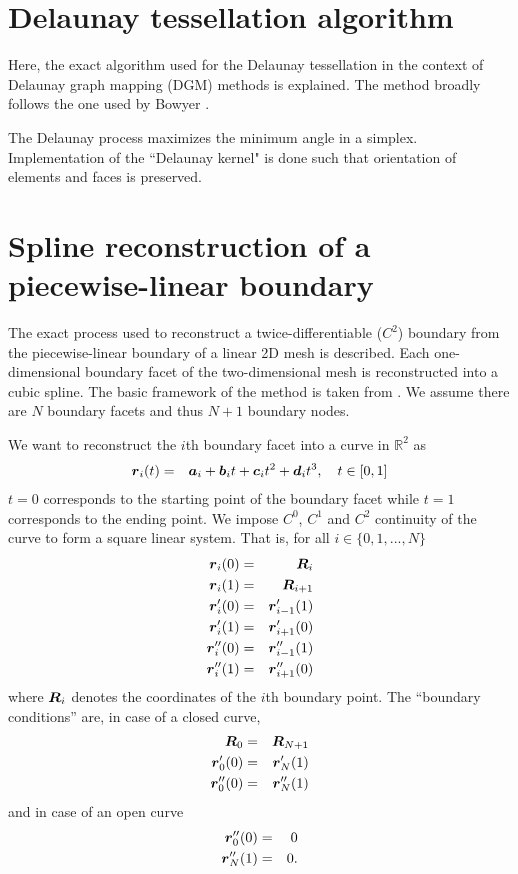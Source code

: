 \chapter{Delaunay tessellation algorithm}

Here, the exact algorithm used for the Delaunay tessellation in the context of Delaunay graph mapping (DGM) methods is explained. The method broadly follows the one used by Bowyer \cite{bowyer}. 

The Delaunay process maximizes the minimum angle in a simplex. Implementation of the ``Delaunay kernel" is done such that orientation of elements and faces is preserved.

\chapter[Spline reconstruction]{Spline reconstruction of a piecewise-linear boundary}
\label{app:spline}

The exact process used to reconstruct a twice-differentiable ($C^2$) boundary from the piecewise-linear boundary of a linear 2D mesh is described. Each one-dimensional boundary facet of the two-dimensional mesh is reconstructed into a cubic spline. The basic framework of the method is taken from \cite{sr:wolframspline}. We assume there are $N$ boundary facets and thus $N+1$ boundary nodes.

We want to reconstruct the $i$th boundary facet into a curve in $\mathbb{R}^2$ as
\begin{eqnarray}
\boldsymbol{r}_i(t) &=& \boldsymbol{a}_i + \boldsymbol{b}_i t + \boldsymbol{c}_it^2 + \boldsymbol{d}_it^3, \quad t \in [0,1]
\end{eqnarray}
$t=0$ corresponds to the starting point of the boundary facet while $t=1$ corresponds to the ending point. We impose $C^0$, $C^1$ and $C^2$ continuity of the curve to form a square linear system. That is, for all $i \in \{0,1,...,N\}$
\begin{eqnarray}
\boldsymbol{r}_i(0) &=& \boldsymbol{R}_i \\
\boldsymbol{r}_i(1) &=& \boldsymbol{R}_{i+1} \\
\boldsymbol{r}_i'(0) &=& \boldsymbol{r}_{i-1}'(1) \\
\boldsymbol{r}_i'(1) &=& \boldsymbol{r}_{i+1}'(0) \\
\boldsymbol{r}_i''(0) &=& \boldsymbol{r}_{i-1}''(1) \\
\boldsymbol{r}_i''(1) &=& \boldsymbol{r}_{i+1}''(0)
\end{eqnarray}
where $\boldsymbol{R}_i$ denotes the coordinates of the $i$th boundary point. The ``boundary conditions'' are, in case of a closed curve,
\begin{eqnarray}
\boldsymbol{R}_0 &=& \boldsymbol{R}_{N+1} \\
\boldsymbol{r}_0'(0) &=& \boldsymbol{r}_N'(1) \\
\boldsymbol{r}_0''(0) &=& \boldsymbol{r}_N''(1)
\end{eqnarray}
and in case of an open curve
\begin{eqnarray}
\boldsymbol{r}_0''(0) &=& 0 \\
\boldsymbol{r}_N''(1) &=& 0.
\end{eqnarray}

